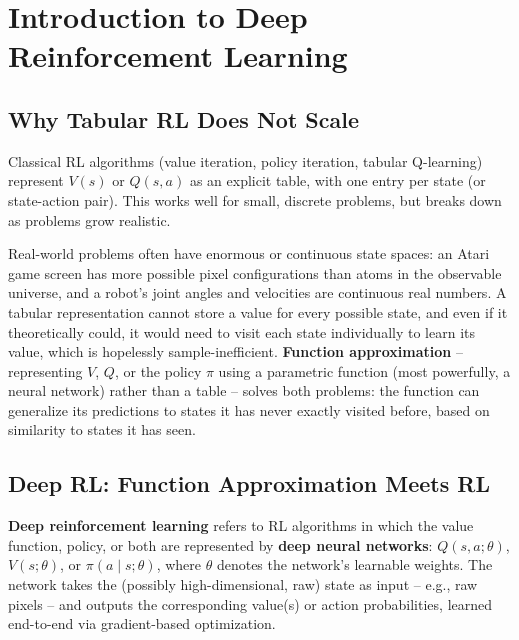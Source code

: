 \documentclass[12pt,a4paper]{article}
\begin{document}
\newpage

\section{Introduction to Deep Reinforcement Learning}

\subsection{Why Tabular RL Does Not Scale}

Classical RL algorithms (value iteration, policy iteration, tabular Q-learning) represent $V(s)$ or $Q(s,a)$ as an explicit table, with one entry per state (or state-action pair). This works well for small, discrete problems, but breaks down as problems grow realistic.

\begin{keyidea}
Real-world problems often have enormous or continuous state spaces: an Atari game screen has more possible pixel configurations than atoms in the observable universe, and a robot's joint angles and velocities are continuous real numbers. A tabular representation cannot store a value for every possible state, and even if it theoretically could, it would need to visit each state individually to learn its value, which is hopelessly sample-inefficient. \textbf{Function approximation} -- representing $V$, $Q$, or the policy $\pi$ using a parametric function (most powerfully, a neural network) rather than a table -- solves both problems: the function can generalize its predictions to states it has never exactly visited before, based on similarity to states it has seen.
\end{keyidea}

\subsection{Deep RL: Function Approximation Meets RL}

\begin{defbox}
\textbf{Deep reinforcement learning} refers to RL algorithms in which the value function, policy, or both are represented by \textbf{deep neural networks}: $Q(s,a;\theta)$, $V(s;\theta)$, or $\pi(a\mid s;\theta)$, where $\theta$ denotes the network's learnable weights. The network takes the (possibly high-dimensional, raw) state as input -- e.g., raw pixels -- and outputs the corresponding value(s) or action probabilities, learned end-to-end via gradient-based optimization.
\end{defbox}
\end{document}
